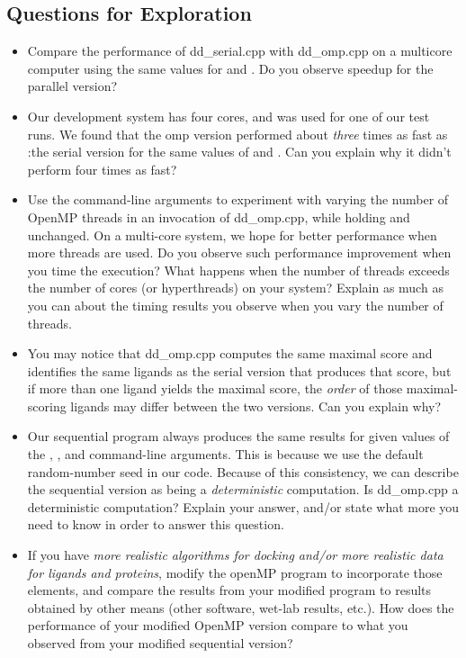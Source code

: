 \documentclass[letterpaper,10pt,openany,oneside]{sphinxmanual}
\begin{document}
\subsection{Questions for Exploration}
\label{openmp/openmp:questions-for-exploration}\begin{itemize}
\item {} 
Compare the performance of dd\_serial.cpp with dd\_omp.cpp on a multicore computer using the same values for  and . Do you observe speedup for the parallel version?

\item {} 
Our development system has four cores, and  was used for one of our test runs. We found that the omp version performed about \emph{three} times as fast as :the serial version for the same values of  and . Can you explain why it didn’t perform four times as fast?

\item {} 
Use the command-line arguments to experiment with varying the number of OpenMP threads in an invocation of dd\_omp.cpp, while holding  and  unchanged. On a multi-core system, we hope for better performance when more threads are used. Do you observe such performance improvement when you time the execution? What happens when the number of threads exceeds the number of cores (or hyperthreads) on your system? Explain as much as you can about the timing results you observe when you vary the number of threads.

\item {} 
You may notice that dd\_omp.cpp computes the same maximal score and identifies the same ligands as the serial version that produces that score, but if more than one ligand yields the maximal score, the \emph{order} of those maximal-scoring ligands may differ between the two versions. Can you explain why?

\item {} 
Our sequential program always produces the same results for given values of the , ,  and  command-line arguments. This is because we use the default random-number seed in our code. Because of this consistency, we can describe the sequential version as being a \emph{deterministic} computation. Is dd\_omp.cpp a deterministic computation? Explain your answer, and/or state what more you need to know in order to answer this question.

\item {} 
If you have \emph{more realistic algorithms for docking and/or more realistic data for ligands and proteins}, modify the openMP program to incorporate those elements, and compare the results from your modified program to results obtained by other means (other software, wet-lab results, etc.). How does the performance of your modified OpenMP version compare to what you observed from your modified sequential version?


\end{itemize}
\end{document}
